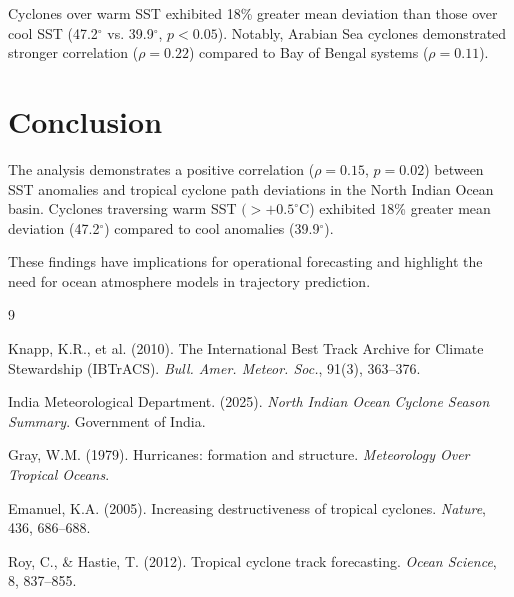 \documentclass[11pt,a4paper]{article}
\begin{document}
Cyclones over warm SST exhibited 18\% greater mean deviation than those over cool SST (47.2$^\circ$ vs. 39.9$^\circ$, $p<0.05$). Notably, Arabian Sea cyclones demonstrated stronger correlation ($\rho=0.22$) compared to Bay of Bengal systems ($\rho=0.11$).

\section{Conclusion}

The analysis demonstrates a positive correlation ($\rho=0.15$, $p=0.02$) between SST anomalies and tropical cyclone path deviations in the North Indian Ocean basin. Cyclones traversing warm SST $(>+0.5^\circ$C) exhibited 18\% greater mean deviation (47.2$^\circ$) compared to cool anomalies (39.9$^\circ$).

These findings have implications for operational forecasting and highlight the need for ocean atmosphere models in trajectory prediction. 


\begin{thebibliography}{9}

 Knapp, K.R., et al. (2010). The International Best Track Archive for Climate Stewardship (IBTrACS). \textit{Bull. Amer. Meteor. Soc.}, 91(3), 363--376.

 India Meteorological Department. (2025). \textit{North Indian Ocean Cyclone Season Summary}. Government of India.

 Gray, W.M. (1979). Hurricanes: formation and structure. \textit{Meteorology Over Tropical Oceans}.

 Emanuel, K.A. (2005). Increasing destructiveness of tropical cyclones. \textit{Nature}, 436, 686--688.

 Roy, C., \& Hastie, T. (2012). Tropical cyclone track forecasting. \textit{Ocean Science}, 8, 837--855.

\end{thebibliography}
\end{document}
